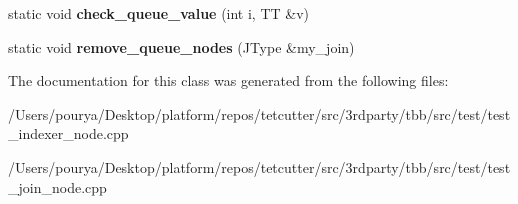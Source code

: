 \begin{DoxyCompactItemize}
\item 
\hypertarget{classserial__queue__helper_ad90a8f20a03bf90596dc3995b4e7b41c}{}static void {\bfseries check\+\_\+queue\+\_\+value} (int i, T\+T \&v)\label{classserial__queue__helper_ad90a8f20a03bf90596dc3995b4e7b41c}

\item 
\hypertarget{classserial__queue__helper_a2b99593f8fc56c40d8e22dca59ecb021}{}static void {\bfseries remove\+\_\+queue\+\_\+nodes} (J\+Type \&my\+\_\+join)\label{classserial__queue__helper_a2b99593f8fc56c40d8e22dca59ecb021}

\end{DoxyCompactItemize}


The documentation for this class was generated from the following files\+:\begin{DoxyCompactItemize}
\item 
/\+Users/pourya/\+Desktop/platform/repos/tetcutter/src/3rdparty/tbb/src/test/test\+\_\+indexer\+\_\+node.\+cpp\item 
/\+Users/pourya/\+Desktop/platform/repos/tetcutter/src/3rdparty/tbb/src/test/test\+\_\+join\+\_\+node.\+cpp\end{DoxyCompactItemize}

